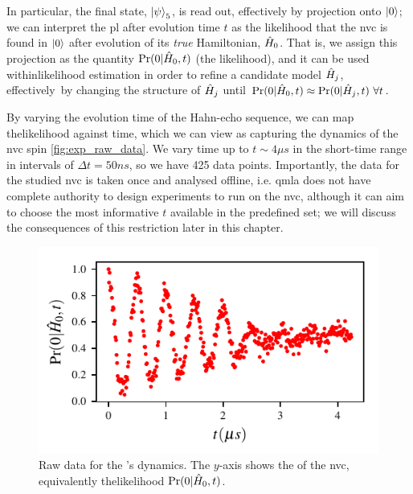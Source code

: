 In particular, the final state, $\ket{\psi}_5$, is read out, effectively by projection onto $\ket{0}$;
    we can interpret the \gls{pl} after evolution time $t$ as the \gls{likelihood} 
    that the \gls{nvc} is found in $\ket{0}$ after evolution of its \emph{true} Hamiltonian, $\hat{H}_0$. 
That is, we assign this projection as the quantity $\Pr(0 | \hat{H}_0, t)$ (the \gls{likelihood}), 
    and it can be used within\gls{likelihood} estimation in order to refine a candidate model $\hat{H}_j$, 
    effectively\footnotemark \ by changing the structure of 
    $\hat{H}_j$ until $\Pr(0 | \hat{H}_0, t) \approx \Pr(0 | \hat{H}_j, t) \ \forall t$. 

\par 

By varying the evolution time of the Hahn-echo sequence, we can map the\gls{likelihood} 
    against time, which we can view as capturing the dynamics of the \gls{nvc} spin \cref{fig:exp_raw_data}.
We vary time up to $t \sim 4 \mu s$ in the short-time range in intervals of $\Delta t = 50 ns$, 
    so we have 425 data points. 
Importantly, the data for the studied \gls{nvc} is taken once and analysed offline, 
    i.e. \gls{qmla} does not have complete authority to design experiments 
    to run on the \gls{nvc}, although it can aim to choose the most informative $t$ 
    available in the predefined set; we will discuss the consequences of this restriction 
    later in this chapter. 

\begin{figure}
    \begin{center}
        \includegraphics{experimental_study/figures/raw_data.pdf}
    \end{center}
    \caption[Raw data for 's dynamics]{
        Raw data for the 's dynamics.
        The $y$-axis shows the  of the \gls{nvc}, 
        equivalently the\gls{likelihood} $\Pr(0 | \hat{H}_0, t)$. 
    }
    \label{fig:nv_raw_data}
\end{figure}


